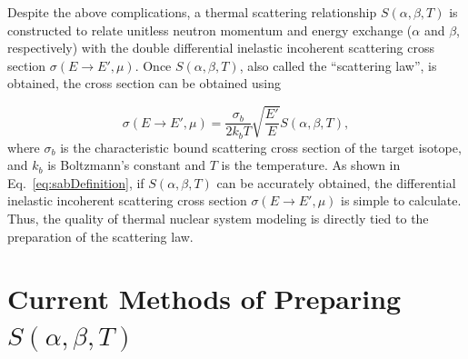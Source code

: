\documentclass[../master.tex]{subfiles}
\begin{document}
		Despite the above complications, a thermal scattering relationship $S(\alpha,\beta,T)$ is constructed to relate unitless neutron momentum and energy exchange ($\alpha$ and $\beta$, respectively) with the double differential inelastic incoherent scattering cross section $\sigma\left(E\rightarrow E',\mu\right)$. Once $S(\alpha,\beta,T)$, also called the ``scattering law'', is obtained, the cross section can be obtained using

		\begin{equation}
			\sigma\left(E\rightarrow E',\mu\right)=\frac{\sigma_{b}}{2k_bT}\sqrt{\frac{E'}{E}}S(\alpha,\beta,T),\label{eq:sabDefinition}
		\end{equation}
		where $\sigma_b$ is the characteristic bound scattering cross section of the target isotope, and $k_b$ is Boltzmann's constant and $T$ is the temperature. As shown in Eq.~\ref{eq:sabDefinition}, if $S(\alpha,\beta,T)$ can be accurately obtained, the differential inelastic incoherent scattering cross section $\sigma\left(E\rightarrow E',\mu\right)$ is simple to calculate. Thus, the quality of thermal nuclear system modeling is directly tied to the preparation of the scattering law.



	\section{Current Methods of Preparing $S(\alpha,\beta,T)$}
\end{document}
